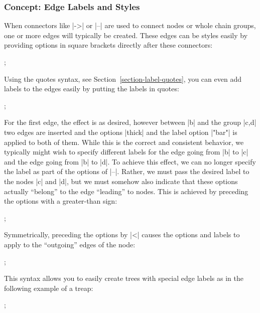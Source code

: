 \subsubsection{Concept: Edge Labels and Styles}

When connectors like |->| or |--| are used to connect nodes or whole chain
groups, one or more edges will typically be created. These edges can be styles
easily by providing options in square brackets directly after these connectors:
%
\begin{codeexample}[preamble={\usetikzlibrary{graphs}}]
\tikz {};
\end{codeexample}

Using the quotes syntax, see Section~\ref{section-label-quotes}, you can even
add labels to the edges easily by putting the labels in quotes:
%
\begin{codeexample}[preamble={\usetikzlibrary{graphs,quotes}}]
\tikz {};
\end{codeexample}

For the first edge, the effect is as desired, however between |b| and the group
|{c,d}| two edges are inserted and the options |thick| and the label option
|"bar"| is applied to both of them. While this is the correct and consistent
behavior, we typically might wish to specify different labels for the edge
going from |b| to |c| and the edge going from |b| to |d|. To achieve this
effect, we can no longer specify the label as part of the options of |--|.
Rather, we must pass the desired label to the nodes |c| and |d|, but we must
somehow also indicate that these options actually ``belong'' to the edge
``leading'' to nodes. This is achieved by preceding the options with a
greater-than sign:
%
\begin{codeexample}[preamble={\usetikzlibrary{graphs,quotes}}]
\tikz {};
\end{codeexample}

Symmetrically, preceding the options by |<| causes the options and labels to
apply to the ``outgoing'' edges of the node:
%
\begin{codeexample}[preamble={\usetikzlibrary{graphs,quotes}}]
\tikz {};
\end{codeexample}

This syntax allows you to easily create trees with special edge labels as in
the following example of a treap:
%
\begin{codeexample}[preamble={\usetikzlibrary{graphs,quotes}}]
\tikz
  ;
\end{codeexample}


